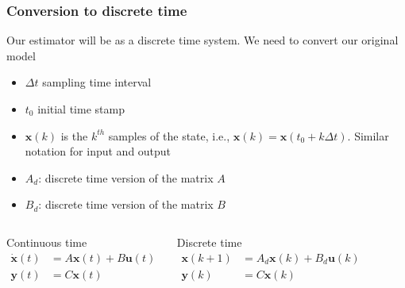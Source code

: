\begin{frame}
\begin{columns}
    \end{columns}
\end{frame}

\begin{frame} 
    \frametitle{Conversion to discrete time}
    Our estimator will be as a discrete time system. We need to convert our original model 
    
    \begin{itemize}
        \item $\Delta t$  sampling time interval
        \item $t_0$ initial time stamp
        \item ${\bm{x}}(k)$ is the $k^{th}$ samples of the state, i.e., $\bm{x}(k)=\bm{x}(t_0+k\Delta t)$. Similar notation for input and output
        \item $A_d$: discrete time version of the matrix $A$
        \item $B_d$: discrete time version of the matrix $B$
    \end{itemize}
     
    \begin{columns}[onlytextwidth]
        \begin{block}{Continuous time}
            \vspace*{-1em}
            \begin{align*}
            \dot{\bm{x}}(t) &= A \bm{x}(t) + B \bm{u}(t)\\
            \bm{y}(t) &= C \bm{x}(t) 
            \end{align*}
        \end{block}    
        \begin{block}{Discrete time}
            \vspace*{-1em}
            \begin{align*}
            \bm{x}(k+1) &= A_d \bm{x}(k) + B_d \bm{u}(k)\\
            \bm{y}(k) &= C \bm{x}(k) 
            \end{align*}
        \end{block}
    \end{columns}
\end{frame}

